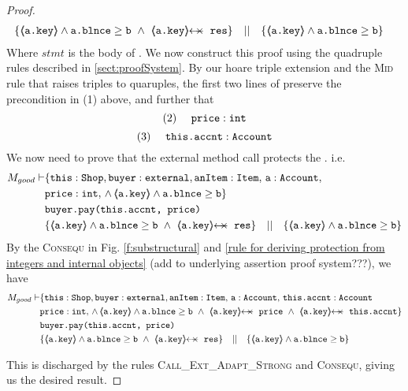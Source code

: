 \begin{proof}
\begin{align*}
		& \{ {\inside{\prg{a.key}} \wedge \prg{a.blnce} \geq \prg{b}}\ \wedge\ \protectedFrom{\prg{a.key}}{\prg{res}}  \} \ \ \  || \ \ \ 
		   \{ {\inside{\prg{a.key}} \wedge \prg{a.blnce} \geq \prg{b}} \}
\end{align*}
\normalsize
Where $stmt$ is the body of . We now construct this proof using the quadruple rules described in \ref{sect:proofSystem}. By our hoare triple extension and the \textsc{Mid} rule that raises triples to quaruples, the first two lines
of \prg{buy} preserve the precondition in (1) above, and further that 
\small
$$
\text{(2)} \ \ \ \ \mbox{\normalfont{\texttt{price}}} : \mbox{\normalfont{\texttt{int}}}
$$ 
$$
\text{(3)} \ \ \ \ \prg{this.accnt} : \prg{Account}
$$ 
We now need to prove that the external method call  protects the . i.e.
\small
\begin{align*}
M_{good} \vdash & \{  \prg{this}:\prg{Shop}, \prg{buyer} : \prg{external}, \prg{anItem} : \prg{Item},\, \prg{a}:\prg{Account},\, \\
				& \prg{price} : \prg{int},\,
				  \wedge\, 
				  {\inside{\prg{a.key}} \wedge \prg{a.blnce} \geq \prg{b}} \} \\
		  		& \prg{buyer.pay(this.accnt, price)}\ \\  
		  		& \{ {\inside{\prg{a.key}} \wedge \prg{a.blnce} \geq \prg{b}}\ \wedge\ \protectedFrom{\prg{a.key}}{\prg{res}}  \} \ \ \  || \ \ \ 
		  		   \{ {\inside{\prg{a.key}} \wedge \prg{a.blnce} \geq \prg{b}} \}
\end{align*}
\normalsize
By the \textsc{Consequ} in Fig. \ref{f:substructural} and \ref{rule for deriving protection from integers and internal objects} (add to underlying assertion proof system???), we have
\small
\begin{align*}
M_{good} \vdash & \{  \prg{this}:\prg{Shop}, \prg{buyer} : \prg{external}, \prg{anItem} : \prg{Item},\, \prg{a}:\prg{Account},\, \prg{this.accnt}:\prg{Account}\\
				& \prg{price} : \prg{int},\,
				  \wedge\, 
				  {\inside{\prg{a.key}} \wedge \prg{a.blnce} \geq \prg{b}}\ \wedge\ 
				  \protectedFrom{\prg{a.key}}{\prg{price}}\ \wedge\ 
				   \protectedFrom{\prg{a.key}}{\prg{this.accnt}}\} \\
		  		& \prg{buyer.pay(this.accnt, price)}\ \\  
		  		& \{ {\inside{\prg{a.key}} \wedge \prg{a.blnce} \geq \prg{b}}\ \wedge\ \protectedFrom{\prg{a.key}}{\prg{res}}  \} \ \ \  || \ \ \ 
		  		   \{ {\inside{\prg{a.key}} \wedge \prg{a.blnce} \geq \prg{b}} \}
\end{align*}
\normalsize

This is discharged by the rules \textsc{Call\_Ext\_Adapt\_Strong} and \textsc{Consequ}, giving us the desired result.
\end{proof}

